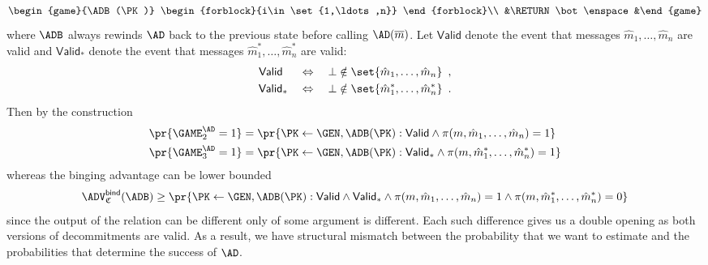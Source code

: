 \documentclass{crypto-exercise}
\newcommand{\CS}{\mathfrak{C}}
\newcommand{\VALID}{\mathsf{Valid}}
\begin{document}
\begin{solution}
\begin{align*}
\begin{game}{\ADB(\PK)}
\begin{forblock}{i\in\set{1,\ldots,n}}
\end{forblock}\\
&\RETURN \bot\enspace
&\end{game}
\end{align*}
where $\ADB$ always rewinds $\AD$ back to the previous state before calling $\AD(\overline{m})$. Let $\VALID$ denote the event that messages $\hat{m}_1,\ldots,\hat{m}_n$ are valid and $\VALID_*$ denote the event that messages $\hat{m}^*_1,\ldots,\hat{m}^*_n$ are valid:
\begin{align*}
\VALID\;\, \quad&\Leftrightarrow\quad \bot\notin\set{\hat{m}_1,\ldots,\hat{m}_n}\enspace,\\
\VALID_* \quad&\Leftrightarrow\quad \bot\notin\set{\hat{m}^*_1,\ldots,\hat{m}^*_n}\enspace.
\end{align*}
Then by the construction
\begin{align*}
\pr{\GAME_2^\AD=1}&=\pr{\PK\gets\GEN, \ADB(\PK): \VALID\wedge \pi(m,\hat{m}_1,\ldots,\hat{m}_n)=1}\\
\pr{\GAME_3^\AD=1}&=\pr{\PK\gets\GEN, \ADB(\PK): \VALID_*\wedge \pi(m,\hat{m}^*_1,\ldots,\hat{m}^*_n)=1}
\end{align*}
whereas the binging advantage can be lower bounded
\begin{align*}
\advBindXX{\CS}{\ADB}\geq\pr{\PK\gets\GEN, \ADB(\PK): \VALID\wedge\VALID_*\wedge \pi(m,\hat{m}_1,\ldots,\hat{m}_n)=1\wedge \pi(m,\hat{m}^*_1,\ldots,\hat{m}^*_n)=0}
\end{align*} 
since the output of the relation can be different only of some argument is different. Each such difference gives us a double opening as both versions of decommitments are valid. As a result, we have structural mismatch between the probability that we want to estimate and the probabilities that determine the success of $\AD$.


\end{solution}
\end{document}
